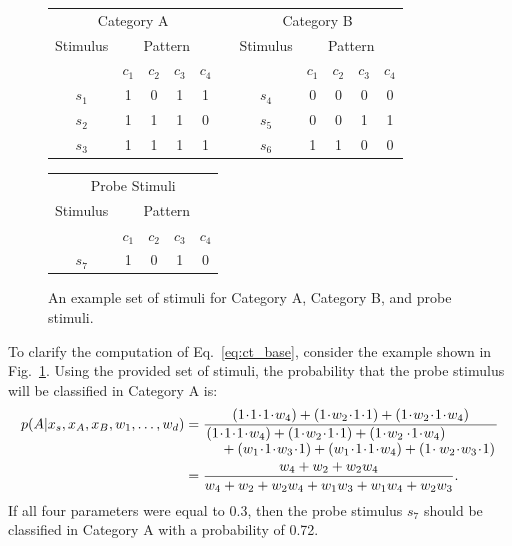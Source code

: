 \documentclass{article}
\begin{document}
\begin{figure}[h]
\hspace{1cm}
\begin{tabular}{ccccccccccc}
\multicolumn{5}{c}{Category A} & \hspace{1cm} & \multicolumn{5}{c}{Category B} \\
Stimulus & \multicolumn{4}{c}{Pattern} & & Stimulus & \multicolumn{4}{c}{Pattern} \\
  & $c_1$ & $c_2$ & $c_3$ & $c_4$ & & & $c_1$ & $c_2$ & $c_3$ & $c_4$  \\ \cline{2-5} \cline{8-11}
$s_1$ & 1 & 0 & 1 & 1 & & $s_4$ & 0 & 0 & 0 & 0 \\
$s_2$ & 1 & 1 & 1 & 0 & & $s_5$ & 0 & 0 & 1 & 1 \\
$s_3$ & 1 & 1 & 1 & 1 & & $s_6$ & 1 & 1 & 0 & 0 
\end{tabular}
\vspace{1cm}
\newline
\begin{tabular}{ccccc}
\multicolumn{5}{c}{Probe Stimuli} \\
Stimulus & \multicolumn{4}{c}{Pattern} \\
  & $c_1$ & $c_2$ & $c_3$ & $c_4$ \\ \cline{2-5} 
$s_7$ & 1 & 0 & 1 & 0 
\end{tabular}
\centering
\caption{An example set of stimuli for Category A, Category B, and probe stimuli.}
\label{fig:cat_example}
\end{figure}

To clarify the computation of Eq.~\ref{eq:ct_base}, consider the example shown in Fig.~\ref{fig:cat_example}. Using the provided set of stimuli, the probability that the probe stimulus will be classified in Category A is: 
\begin{align}
    p(A | x_s, x_A, x_B, w_1, \dots, w_d) 
        &= \frac{(1\!\cdot\!1\!\cdot\!1\!\cdot\!w_4) + (1\!\cdot\!w_2\!\cdot\!1\!\cdot\!1) + (1\!\cdot\!w_2\!\cdot\!1\!\cdot\!w_4)}{ \splitfrac{(1\!\cdot\!1\!\cdot\!1\!\cdot\!w_4) + (1\!\cdot\!w_2\!\cdot\!1\!\cdot\!1) + (1\!\cdot\!w_2 \cdot\!1\!\cdot\!w_4)}{+ (w_1\!\cdot\!1\!\cdot\!w_3\!\cdot\!1) + (w_1\!\cdot\!1\!\cdot\!1\!\cdot\!w_4) + (1\!\cdot w_2\!\cdot\!w_3\!\cdot\!1)}} \notag \\
        &= \frac{w_4 + w_2 + w_2w_4}{w_4 + w_2 + w_2w_4 + w_1w_3 + w_1w_4 + w_2w_3}. 
\end{align}
If all four parameters were equal to 0.3, then the probe stimulus $s_7$ should be classified in Category A with a probability of 0.72. 
\end{document}
